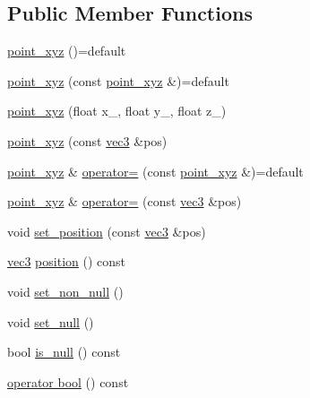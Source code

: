 \subsection*{Public Member Functions}
\begin{DoxyCompactItemize}
\item 
\hyperlink{structtlz_1_1point__xyz_af226716162e0d1c82c9d0327cd6c1435}{point\+\_\+xyz} ()=default
\item 
\hyperlink{structtlz_1_1point__xyz_a07d735ed19836eb5cd590edee45a3387}{point\+\_\+xyz} (const \hyperlink{structtlz_1_1point__xyz}{point\+\_\+xyz} \&)=default
\item 
\hyperlink{structtlz_1_1point__xyz_a1e5ec91a706fed37357868ab2f774d78}{point\+\_\+xyz} (float x\+\_\+, float y\+\_\+, float z\+\_\+)
\item 
\hyperlink{structtlz_1_1point__xyz_a002a0afbd87160c119f19f7ef22b7e53}{point\+\_\+xyz} (const \hyperlink{namespacetlz_ad0646d752ddb9d40d702d40cc6dc54a1}{vec3} \&pos)
\item 
\hyperlink{structtlz_1_1point__xyz}{point\+\_\+xyz} \& \hyperlink{structtlz_1_1point__xyz_a02c95e5cdffd5ebbe54c9ce69fed072c}{operator=} (const \hyperlink{structtlz_1_1point__xyz}{point\+\_\+xyz} \&)=default
\item 
\hyperlink{structtlz_1_1point__xyz}{point\+\_\+xyz} \& \hyperlink{structtlz_1_1point__xyz_a53f7f811317ff1ccc1276bf74b8fe850}{operator=} (const \hyperlink{namespacetlz_ad0646d752ddb9d40d702d40cc6dc54a1}{vec3} \&pos)
\item 
void \hyperlink{structtlz_1_1point__xyz_a139f2232abea0da278b0e7a94ccbdf23}{set\+\_\+position} (const \hyperlink{namespacetlz_ad0646d752ddb9d40d702d40cc6dc54a1}{vec3} \&pos)
\item 
\hyperlink{namespacetlz_ad0646d752ddb9d40d702d40cc6dc54a1}{vec3} \hyperlink{structtlz_1_1point__xyz_a299278d210b2308007b47b5013717cda}{position} () const 
\item 
void \hyperlink{structtlz_1_1point__xyz_a667ff7532d7de663907ea34b3338cbf2}{set\+\_\+non\+\_\+null} ()
\item 
void \hyperlink{structtlz_1_1point__xyz_aa168b2b19af27325f70653b7bba338f2}{set\+\_\+null} ()
\item 
bool \hyperlink{structtlz_1_1point__xyz_a0eb5ad688cca90af5e36e95d75171b5e}{is\+\_\+null} () const 
\item 
\hyperlink{structtlz_1_1point__xyz_a21a0f1c14501d9f61383f9b00f14d0d7}{operator bool} () const 
\end{DoxyCompactItemize}
